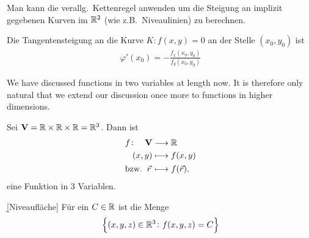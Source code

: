 \documentclass[12pt]{article}
\begin{document}
\begin{fct}
    Man kann die verallg.\ Kettenregel anwenden um die Steigung an implizit gegebenen Kurven im $\mathbb{R}^2$ (wie z.B.\ Niveaulinien) zu berechnen.
\end{fct}

\begin{thmb}{}
    Die Tangentensteigung an die Kurve $K: f(x,y)=0$ an der Stelle $(x_0,y_0)$ ist
    \begin{align}
        \varphi'(x_0)=-\frac{f_x(x_0,y_0)}{f_y(x_0,y_0)}
    \end{align}
\end{thmb}

We have discussed functions in two variables at length now. It is therefore
only natural that we extend our discussion once more to functions in higher
dimensions.

\begin{thmb}{}
    Sei $\mathbf{V}=\mathbb{R}\times\mathbb{R}\times\mathbb{R}=\mathbb{R}^3$. Dann ist
    \begin{align}
         & \begin{aligned}
               f\colon\quad \mathbf{V} & \longrightarrow\mathbb{R}  \\
               (x,y)                   & \longmapsto f(x,y)
           \end{aligned}    \\
         & \text{bzw.}\ \:\vec{r}\,\longmapsto f(\vec{r}),
    \end{align}
    eine Funktion in 3 Variablen.
\end{thmb}\vspace*{1em}

\begin{defn}{\b{[Niveaufläche]}}
    Für ein $C\in\mathbb{R}$ ist die Menge
    \begin{align}
        \left\{(x,y,z)\in\mathbb{R}^3\colon f(x,y,z)=C\right\}
    \end{align}
\end{defn}



\end{document}
